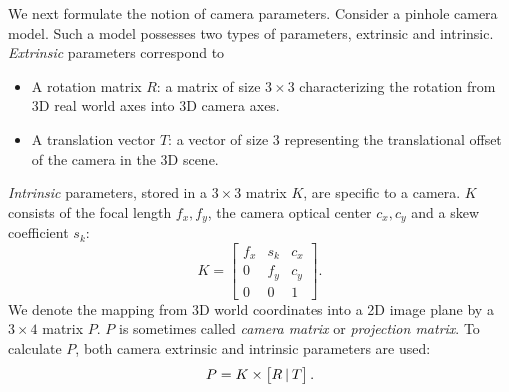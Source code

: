  \label{sec:cam_param_technical}
We next formulate the notion of camera parameters.
Consider a pinhole camera model. Such a model possesses two types of parameters, extrinsic and intrinsic. \emph{Extrinsic} parameters correspond to 
\begin{itemize}
    \item A rotation matrix $R$: a matrix of size $3\times3$ characterizing the rotation from 3D real world axes into 3D camera axes.
    \item A translation vector $T$: a vector of size  $3$ representing the translational offset of the camera in the 3D scene.
\end{itemize} 
\emph{Intrinsic} parameters, stored in a $3\times3$ matrix $K$, are specific to a camera. $K$ consists of the focal length $f_x , f_y$, the camera optical center $c_x ,c_y$ and a skew coefficient $s_k$:
\begin{equation} \label{eq:intrinsics}
    K = \begin{bmatrix}
f_x & s_k & c_x\\
0 & f_y & c_y \\
0 & 0 & 1
\end{bmatrix}.
\end{equation}
We denote the mapping from 3D world coordinates into a 2D image plane by a $3\times4$ matrix $P$. $P$ is sometimes called  \emph{camera matrix} or\emph{ projection matrix}.
To calculate $P$, both camera extrinsic and intrinsic parameters are used:
\begin{equation}
\label{P matrix}
    P = K \times \begin{bmatrix}
R \kern2pt | \kern2pt T
\end{bmatrix} .
\end{equation}

